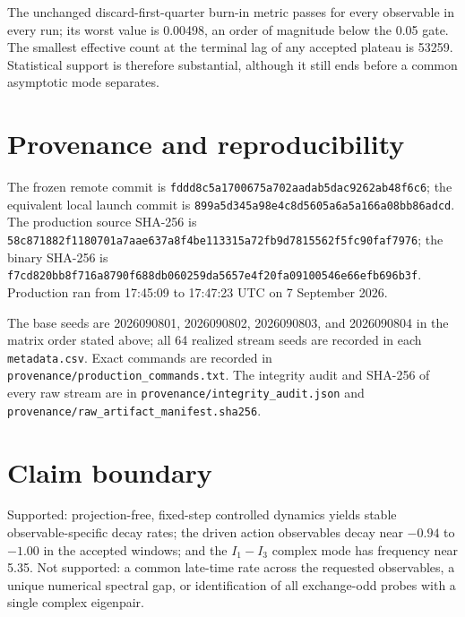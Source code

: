 \documentclass[10pt]{article}
\begin{document}
The unchanged discard-first-quarter burn-in metric passes for every observable
in every run; its worst value is 0.00498, an order of magnitude below the 0.05
gate.  The smallest effective count at the terminal lag of any accepted
plateau is 53259.  Statistical support is therefore substantial, although it
still ends before a common asymptotic mode separates.

\section{Provenance and reproducibility}

The frozen remote commit is
\nolinkurl{fddd8c5a1700675a702aadab5dac9262ab48f6c6}; the equivalent local launch
commit is \nolinkurl{899a5d345a98e4c8d5605a6a5a166a08bb86adcd}.
The production source SHA-256 is
\nolinkurl{58c871882f1180701a7aae637a8f4be113315a72fb9d7815562f5fc90faf7976};
the binary SHA-256 is
\nolinkurl{f7cd820bb8f716a8790f688db060259da5657e4f20fa09100546e66efb696b3f}.
Production ran from 17:45:09 to 17:47:23 UTC on 7 September 2026.

The base seeds are 2026090801, 2026090802, 2026090803, and 2026090804 in the
matrix order stated above; all 64 realized stream seeds are recorded in each
\nolinkurl{metadata.csv}.  Exact commands are recorded in
\nolinkurl{provenance/production_commands.txt}.  The integrity audit and
SHA-256 of every raw stream are in
\nolinkurl{provenance/integrity_audit.json} and
\nolinkurl{provenance/raw_artifact_manifest.sha256}.

\section*{Claim boundary}

Supported: projection-free, fixed-step controlled dynamics yields stable
observable-specific decay rates; the driven action observables decay near
$-0.94$ to $-1.00$ in the accepted windows; and the $I_1-I_3$ complex mode has
frequency near 5.35.  Not supported: a common late-time rate across the
requested observables, a unique numerical spectral gap, or identification of
all exchange-odd probes with a single complex eigenpair.
\end{document}
